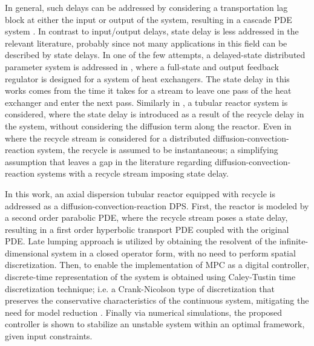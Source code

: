 In general, such delays can be addressed by considering a transportation lag block at either the input or output of the system, resulting in a cascade PDE system \cite{Hiratsuka1969IEEE, mohammadi2012lq, Guilherme2019ACC}. In contrast to input/output delays, state delay is less addressed in the relevant literature, probably since not many applications in this field can be described by state delays. In one of the few attempts, a delayed-state distributed parameter system is addressed in \cite{ozorio2019heat}, where a full-state and output feedback regulator is designed for a system of heat exchangers. The state delay in this works comes from the time it takes for a stream to leave one pass of the heat exchanger and enter the next pass. Similarly in \cite{qi2021output}, a tubular reactor system is considered, where the state delay is introduced as a result of the recycle delay in the system, without considering the diffusion term along the reactor. Even in \cite{khatibi2021model} where the recycle stream is considered for a distributed diffusion-convection-reaction system, the recycle is assumed to be instantaneous; a simplifying assumption that leaves a gap in the literature regarding diffusion-convection-reaction systems with a recycle stream imposing state delay.

In this work, an axial dispersion tubular reactor equipped with recycle is addressed as a diffusion-convection-reaction DPS. First, the reactor is modeled by a second order parabolic PDE, where the recycle stream poses a state delay, resulting in a first order hyperbolic transport PDE coupled with the original PDE. Late lumping approach is utilized by obtaining the resolvent of the infinite-dimensional system in a closed operator form, with no need to perform spatial discretization. Then, to enable the implementation of MPC as a digital controller, discrete-time representation of the system is obtained using Caley-Tustin time discretization technique; i.e. a Crank-Nicolson type of discretization that preserves the conservative characteristics of the continuous system, mitigating the need for model reduction \cite{havu2007cayley, xu2017linear}. Finally via numerical simulations, the proposed controller is shown to stabilize an unstable system within an optimal framework, given input constraints.